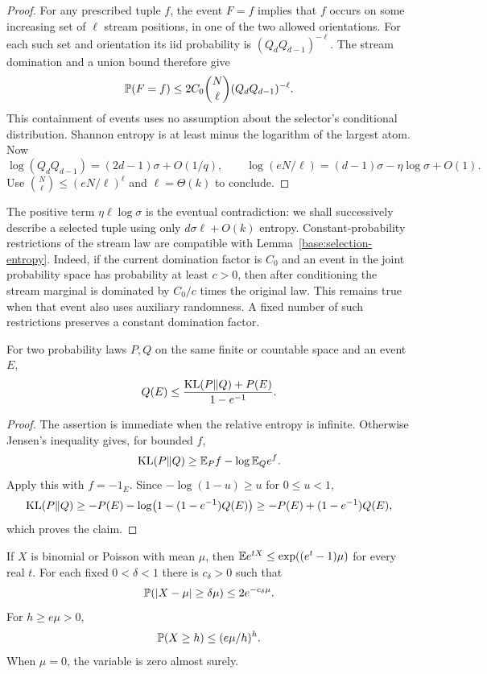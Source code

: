 \begin{proof}
For any prescribed tuple $f$, the event $F=f$ implies that $f$ occurs
on some increasing set of $\ell$ stream positions, in one of the two
allowed orientations. For each such set and orientation its iid
probability is $(Q_dQ_{d-1})^{-\ell}$. The stream domination and a
union bound therefore give
\[
 \mathbb P(F=f)\le2C_0\binom N\ell(Q_dQ_{d-1})^{-\ell}.
\]
This containment of events uses no assumption about the selector's
conditional distribution. Shannon entropy is at least minus the
logarithm of the largest atom. Now
\[
 \log(Q_dQ_{d-1})=(2d-1)\sigma+O(1/q),
 \qquad
 \log(eN/\ell)=(d-1)\sigma-\eta\log\sigma+O(1).
\]
Use $\binom N\ell\le(eN/\ell)^\ell$ and $\ell=\Theta(k)$ to conclude.
\end{proof}

The positive term $\eta\ell\log\sigma$ is the eventual contradiction:
we shall successively describe a selected tuple using only
$d\sigma\ell+O(k)$ entropy. Constant-probability restrictions of the
stream law are compatible with Lemma~\ref{base:selection-entropy}.
Indeed, if the current domination factor is $C_0$ and an event in the
joint probability space has probability at least $c>0$, then after
conditioning the stream marginal is dominated by $C_0/c$ times the
original law. This remains true when that event also uses auxiliary
randomness. A fixed number of such restrictions preserves a constant
domination factor.

\begin{lemma}
\label{base:event-transfer}
For two probability laws $P,Q$ on the same finite or countable space
and an event $E$,
\begin{equation}
 Q(E)\le\frac{\operatorname{KL}(P\Vert Q)+P(E)}{1-e^{-1}}.
 \label{base:kl-event}
\end{equation}
\end{lemma}

\begin{proof}
The assertion is immediate when the relative entropy is infinite.
Otherwise Jensen's inequality gives, for bounded $f$,
\[
 \operatorname{KL}(P\Vert Q)\ge \mathbb E_P f-\log\mathbb E_Q e^f.
\]
Apply this with $f=-1_E$. Since $-\log(1-u)\ge u$ for $0\le u<1$,
\[
 \operatorname{KL}(P\Vert Q)
 \ge-P(E)-\log\bigl(1-(1-e^{-1})Q(E)\bigr)
 \ge-P(E)+(1-e^{-1})Q(E),
\]
which proves the claim.
\end{proof}

\begin{lemma}
\label{base:tails}
If $X$ is binomial or Poisson with mean $\mu$, then
$\mathbb E e^{tX}\le\exp((e^t-1)\mu)$ for every real $t$. For each fixed
$0<\delta<1$ there is $c_\delta>0$ such that
\[
 \mathbb P(|X-\mu|\ge\delta\mu)\le2e^{-c_\delta\mu}.
\]
For $h\ge e\mu>0$,
\[
 \mathbb P(X\ge h)\le(e\mu/h)^h.
\]
When $\mu=0$, the variable is zero almost surely.
\end{lemma}

